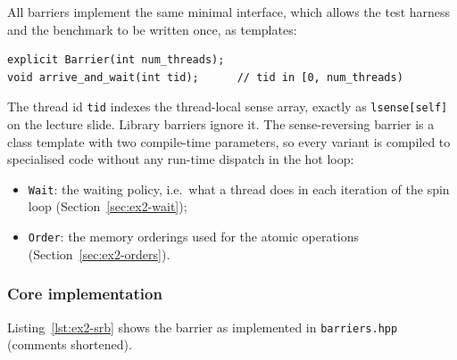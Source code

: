 All barriers implement the same minimal interface, which allows the test
harness and the benchmark to be written once, as templates:

\begin{lstlisting}[numbers=none]
explicit Barrier(int num_threads);
void arrive_and_wait(int tid);      // tid in [0, num_threads)
\end{lstlisting}

The thread id \texttt{tid} indexes the thread-local sense array, exactly as
\texttt{lsense[self]} on the lecture slide. Library barriers ignore it.
The sense-reversing barrier is a class template with two compile-time
parameters, so every variant is compiled to specialised code without any
run-time dispatch in the hot loop:

\begin{itemize}
    \item \texttt{Wait}: the waiting policy, i.e.\ what a thread does in each
          iteration of the spin loop (Section~\ref{sec:ex2-wait});
    \item \texttt{Order}: the memory orderings used for the atomic
          operations (Section~\ref{sec:ex2-orders}).
\end{itemize}

\subsubsection{Core implementation}

Listing~\ref{lst:ex2-srb} shows the barrier as implemented in
\texttt{barriers.hpp} (comments shortened).

